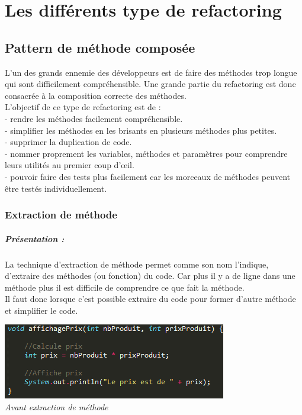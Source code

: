 \documentclass[a4paper,twoside,12pt,openright]{report}
\begin{document}
\chapter{Les différents type de refactoring}
\section{Pattern de méthode composée}
L'un des grands ennemie des développeurs est de faire des méthodes trop longue qui sont difficilement compréhensible.
Une grande partie du refactoring est donc consacrée à la composition correcte des méthodes.\cite{ref5}\\

L'objectif de ce type de refactoring est de :\\
- rendre les méthodes facilement compréhensible.\\
- simplifier les méthodes en les brisants en plusieurs méthodes plus petites.\\
- supprimer la duplication de code.\\
- nommer proprement les variables, méthodes et paramètres pour comprendre leurs utilités au premier coup d'œil.\\
- pouvoir faire des tests plus facilement car les morceaux de méthodes peuvent être testés individuellement.\cite{ref6}

\newpage

\subsection{Extraction de méthode}
\paragraph{Présentation :} 
La technique d'extraction de méthode permet comme son nom l'indique, d'extraire des méthodes (ou fonction) du code. Car plus il y a de ligne dans une méthode plus il est difficile de comprendre ce que fait la méthode.\\
Il faut donc lorsque c'est possible extraire du code pour former d'autre méthode et simplifier le code.
\begin{center}
\includegraphics[scale=1]{Image/Extraction_Methode.png}\\
\itshape{Avant extraction de méthode}
\end{center}
\end{document}
